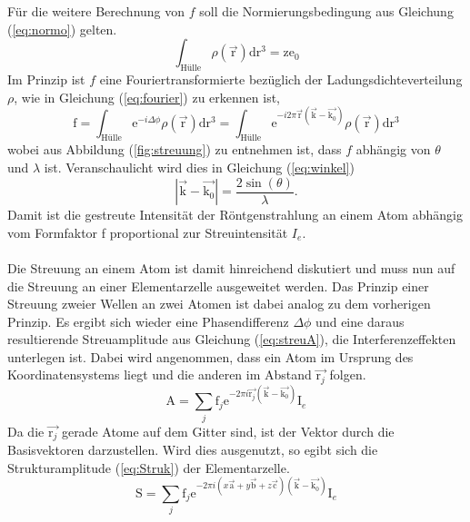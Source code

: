 Für die weitere Berechnung von $f$ soll die Normierungsbedingung aus Gleichung (\ref{eq:normo}) gelten.
\begin{equation}
 \int_{\text{Hülle}} \rho (\vec{\text{r}}) \text{d}\text{r}^3 = \text{z}\text{e}_0
\label{eq:normo}
\end{equation}
Im Prinzip ist $f$ eine Fouriertransformierte bezüglich der Ladungsdichteverteilung $\rho$, wie in Gleichung (\ref{eq:fourier}) zu erkennen ist,
\begin{equation}
\text{f} = \int_{\text{Hülle}} \text{e}^{-i\Delta\phi}\rho(\vec{\text{r}}) \text{d}\text{r}^3 = \int_{\text{Hülle}} \text{e}^{-i2\pi \vec{\text{r}}(\vec{\text{k}}-\vec{\text{k}_0})}\rho(\vec{\text{r}}) \text{d}\text{r}^3
\label{eq:fourier}
\end{equation}
wobei aus Abbildung (\ref{fig:streuung}) zu entnehmen ist, dass $f$ abhängig von $\theta$ und $\lambda$ ist.
Veranschaulicht wird dies in Gleichung (\ref{eq:winkel})
\begin{equation}
|\vec{\text{k}}-\vec{\text{k}_0}| = \frac{2 \sin(\theta)}{\lambda}.
\label{eq:winkel}
\end{equation}
Damit ist die gestreute Intensität der Röntgenstrahlung an einem Atom abhängig vom Formfaktor f proportional zur Streuintensität $I_e$.\\\\
Die Streuung an einem Atom ist damit hinreichend diskutiert und muss nun auf die Streuung an einer Elementarzelle ausgeweitet werden.
Das Prinzip  einer Streuung zweier Wellen an zwei Atomen ist dabei analog zu dem vorherigen Prinzip.
Es ergibt sich wieder eine Phasendifferenz $\Delta \phi$ und eine daraus resultierende Streuamplitude aus Gleichung (\ref{eq:streuA}), die Interferenzeffekten unterlegen ist.
Dabei wird angenommen, dass ein Atom im Ursprung des Koordinatensystems liegt und die anderen im Abstand $\vec{\text{r}_j}$ folgen.
\begin{equation}
\text{A} = \sum_j \text{f}_j \text{e}^{-2\pi i \vec{\text{r}_j} (\vec{\text{k}}-\vec{\text{k}_0}) } \text{I}_e
\label{eq:streuA}
\end{equation}
Da die $\vec{\text{r}_j}$ gerade Atome auf dem Gitter sind, ist der Vektor durch die Basisvektoren darzustellen.
Wird dies ausgenutzt, so egibt sich die Strukturamplitude (\ref{eq:Struk}) der Elementarzelle.
\begin{equation}
\text{S} = \sum_j \text{f}_j \text{e}^{-2\pi i (x\vec{\text{a}}+y \vec{\text{b}}+ z \vec{\text{c}}) (\vec{\text{k}}-\vec{\text{k}_0}) } \text{I}_e
\label{eq:Struk}
\end{equation}
